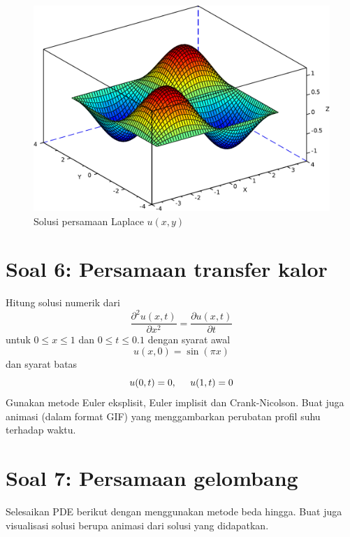 \documentclass[12pt,bahasa]{article}
\begin{document}
\begin{figure}[H]
\centering
\includegraphics[scale=0.5]{poisson2d.pdf}
\par
\caption{Solusi persamaan Laplace $u(x,y)$}
\end{figure}


\section{Soal 6: Persamaan transfer kalor}

Hitung solusi numerik dari
\begin{equation}
\frac{\partial^2 u(x,t)}{\partial x^2} = \frac{\partial u(x,t)}{\partial t}
\end{equation}
untuk $0 \leq x \leq 1$ dan $0 \leq t \leq 0.1$ dengan syarat awal
\begin{equation}
u(x,0) = \sin(\pi x)
\end{equation}
dan syarat batas
\begin{equation}
u(0,t) = 0,\hspace{0.5cm} u(1,t) = 0
\end{equation}
Gunakan metode Euler eksplisit, Euler implisit dan Crank-Nicolson.
Buat juga animasi (dalam format GIF) yang menggambarkan perubatan profil
suhu terhadap waktu.

\section{Soal 7: Persamaan gelombang}

Selesaikan PDE berikut dengan menggunakan metode beda hingga.
Buat juga visualisasi solusi berupa animasi dari solusi yang didapatkan.
\end{document}

